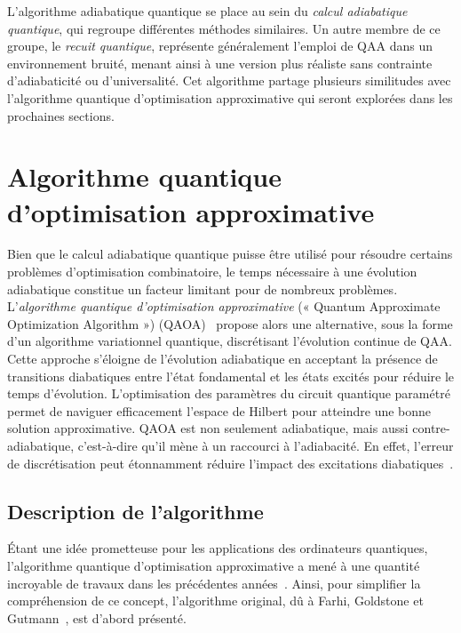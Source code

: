 L'algorithme adiabatique quantique se place au sein du \textit{calcul adiabatique quantique}, qui regroupe différentes méthodes similaires. Un autre membre de ce groupe, le \textit{recuit quantique}, représente généralement l'emploi de QAA dans un environnement bruité, menant ainsi à une version plus réaliste sans contrainte d'adiabaticité ou d'universalité. Cet algorithme partage plusieurs similitudes avec l'algorithme quantique d'optimisation approximative qui seront explorées dans les prochaines sections. 


\section{Algorithme quantique d'optimisation approximative}
\label{sec:algorithme-quantique-d'optimisation-approximative}

Bien que le calcul adiabatique quantique puisse être utilisé pour résoudre certains problèmes d'optimisation combinatoire, le temps nécessaire à une évolution adiabatique constitue un facteur limitant pour de nombreux problèmes. L'\textit{algorithme quantique d'optimisation approximative} (« Quantum Approximate Optimization Algorithm ») (QAOA)~\cite{farhiQuantumApproximateOptimization2014} propose alors une alternative, sous la forme d'un algorithme variationnel quantique, discrétisant l'évolution continue de QAA. Cette approche s'éloigne de l'évolution adiabatique en acceptant la présence de transitions diabatiques entre l'état fondamental et les états excités pour réduire le temps d'évolution. L'optimisation des paramètres du circuit quantique paramétré permet de naviguer efficacement l'espace de Hilbert pour atteindre une bonne solution approximative. QAOA est non seulement adiabatique, mais aussi contre-adiabatique, c'est-à-dire qu'il mène à un raccourci à l'adiabacité. En effet, l'erreur de discrétisation peut étonnamment réduire l'impact des excitations diabatiques~\cite{wurtzCounterdiabaticityQuantumApproximate2022}.


\subsection{Description de l'algorithme}
\label{subsec:description-algorithme}

Étant une idée prometteuse pour les applications des ordinateurs quantiques, l'algorithme quantique d'optimisation approximative a mené à une quantité incroyable de travaux dans les précédentes années~\cite{zhouQuantumApproximateOptimization2020, blekosReviewQuantumApproximate2024}. Ainsi, pour simplifier la compréhension de ce concept, l'algorithme original, dû à Farhi, Goldstone et Gutmann~\cite{farhiQuantumApproximateOptimization2014}, est d'abord présenté.

